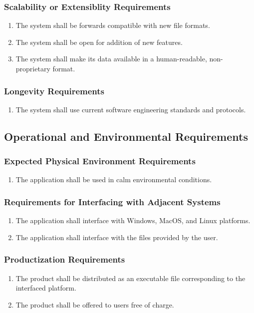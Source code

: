 \documentclass{article}
\begin{document}
\subsubsection{Scalability or Extensiblity Requirements}
\begin{enumerate}[SER1]
    \item The system shall be forwards compatible with new file formats.
    \item The system shall be open for addition of new features.
    \item The system shall make its data available in a human-readable, non-proprietary format.
\end{enumerate}

\subsubsection{Longevity Requirements}
\begin{enumerate}[LOR1]
    \item The system shall use current software engineering standards and protocols.
\end{enumerate}

\subsection{Operational and Environmental Requirements}
\subsubsection{Expected Physical Environment Requirements}
\begin{enumerate}[EPE1]
    \item The application shall be used in calm environmental conditions.
\end{enumerate}

\subsubsection{Requirements for Interfacing with Adjacent Systems}
\begin{enumerate}[R{I}{A}1]
    \item The application shall interface with Windows, MacOS, and Linux platforms.
    \item The application shall interface with the files provided by the user.
\end{enumerate}

\subsubsection{Productization Requirements}
\begin{enumerate}[PRO1]
    \item The product shall be distributed as an executable file corresponding to the interfaced platform.
    \item The product shall be offered to users free of charge.
\end{enumerate}
\end{document}

